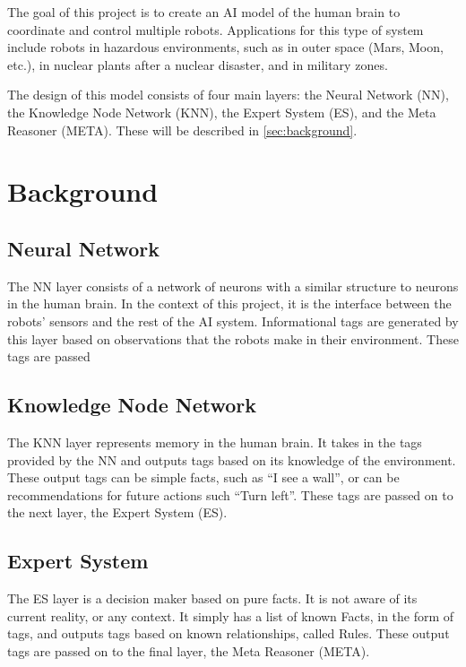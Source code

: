\documentclass[titlepage,11pt]{article}
\begin{document}
The goal of this project is to create an AI model of the human brain to coordinate and control multiple robots. Applications for this type of system include robots in hazardous environments, such as in outer space (Mars, Moon, etc.), in nuclear plants after a nuclear disaster, and in military zones.

The design of this model consists of four main layers: the Neural Network (NN), the Knowledge Node Network (KNN), the Expert System (ES), and the Meta Reasoner (META). These will be described in \autoref{sec:background}.

\section{Background} \label{sec:background}

\subsection{Neural Network}

The NN layer consists of a network of neurons with a similar structure to neurons in the human brain. In the context of this project, it is the interface between the robots' sensors and the rest of the AI system. Informational tags are generated by this layer based on observations that the robots make in their environment. These tags are passed

\subsection{Knowledge Node Network}

The KNN layer represents memory in the human brain. It takes in the tags provided by the NN and outputs tags based on its knowledge of the environment. These output tags can be simple facts, such as ``I see a wall'', or can be recommendations for future actions such ``Turn left''. These tags are passed on to the next layer, the Expert System (ES).

\subsection{Expert System}

The ES layer is a decision maker based on pure facts. It is not aware of its current reality, or any context. It simply has a list of known Facts, in the form of tags, and outputs tags based on known relationships, called Rules. These output tags are passed on to the final layer, the Meta Reasoner (META).
\end{document}
